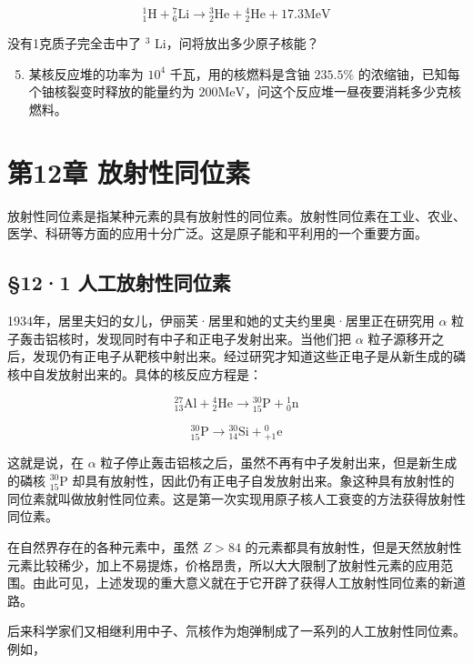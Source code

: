 \[
{ } _ { 1 } ^ { 1 } \mathrm{H} + { } _ { 6 } ^ { 7 } \mathrm{Li} \longrightarrow { } _ { 2 } ^ { 3 } \mathrm{He} + { } _ { 2 } ^ { 4 } \mathrm{He} + 17.3 \mathrm{MeV}
\]

没有1克质子完全击中了 \(^{3}\) Li，问将放出多少原子核能？

\begin{enumerate}
\setcounter{enumi}{4}
\item
  某核反应堆的功率为 \(10^{4}\) 千瓦，用的核燃料是含铀 \(235.5\%\)
  的浓缩铀，已知每个铀核裂变时释放的能量约为
  \(200\mathrm{MeV}\)，问这个反应堆一昼夜要消耗多少克核燃料。
\end{enumerate}

\chapter{第12章
放射性同位素}

放射性同位素是指某种元素的具有放射性的同位素。放射性同位素在工业、农业、医学、科研等方面的应用十分广泛。这是原子能和平利用的一个重要方面。

\section{§12·1
人工放射性同位素}

1934年，居里夫妇的女儿，伊丽芙·居里和她的丈夫约里奥·居里正在研究用
\(\alpha\) 粒子轰击铝核时，发现同时有中子和正电子发射出来。当他们把
\(\alpha\)
粒子源移开之后，发现仍有正电子从靶核中射出来。经过研究才知道这些正电子是从新生成的磷核中自发放射出来的。具体的核反应方程是：

\[
{}^{27}_{13}\mathrm{Al}+{}^{4}_{2}\mathrm{He}\longrightarrow{}^{30}_{15}\mathrm{P}+{}^{1}_{0}\mathrm{n}
\]

\[
{}^{30}_{15}\mathrm{P}\longrightarrow{}^{30}_{14}\mathrm{Si}+{}^{0}_{+1}\mathrm{e}
\]

这就是说，在 \(\alpha\)
粒子停止轰击铝核之后，虽然不再有中子发射出来，但是新生成的磷核
\(^{30}_{15}\mathrm{P}\)
却具有放射性，因此仍有正电子自发放射出来。象这种具有放射性的同位素就叫做放射性同位素。这是第一次实现用原子核人工衰变的方法获得放射性同位素。

在自然界存在的各种元素中，虽然 \(Z > 84\)
的元素都具有放射性，但是天然放射性元素比较稀少，加上不易提炼，价格昂贵，所以大大限制了放射性元素的应用范围。由此可见，上述发现的重大意义就在于它开辟了获得人工放射性同位素的新道路。

后来科学家们又相继利用中子、氘核作为炮弹制成了一系列的人工放射性同位素。例如，

